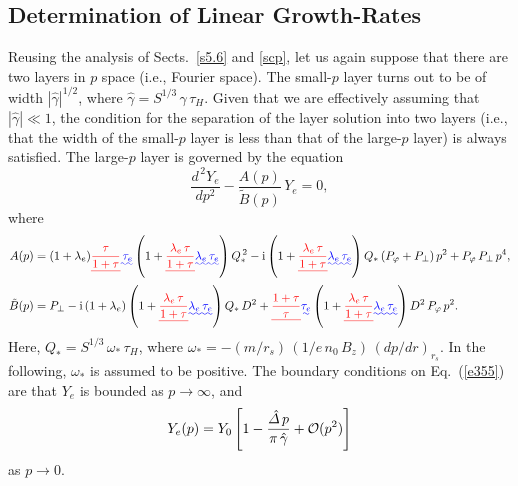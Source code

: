 \documentclass[12pt,prb,aps]{revtex4-1}
\providecommand{\DIFadd}[1]{{\protect\color{blue}\uwave{#1}}} %
\providecommand{\DIFdel}[1]{{\protect\color{red}\sout{#1}}}                      %
\providecommand{\DIFaddbegin}{} %
\providecommand{\DIFaddend}{} %
\providecommand{\DIFdelbegin}{} %
\providecommand{\DIFdelend}{} %
\begin{document}
\subsection{Determination of Linear Growth-Rates}\label{s6.3}
Reusing the analysis of Sects.~\ref{s5.6} and \ref{scp}, let us again suppose that there are two layers in $p$ space (i.e., Fourier space). The
small-$p$ layer turns out to be of width $|\hat{\gamma}|^{1/2}$, where $\hat{\gamma} = S^{1/3}\,\gamma\,\tau_H$. Given that we are effectively assuming that
$|\hat{\gamma}|\ll 1$, the condition for the separation of the layer solution into two layers (i.e., that the width of the small-$p$ layer is less than that of the large-$p$ layer) is always satisfied. The large-$p$ layer is governed by the equation
\begin{equation}\label{e355}
\frac{d^{\,2} Y_e}{dp^2} - \frac{A(p)}{\tilde{B}(p)} \,Y_e =0,
\end{equation}
where 
\begin{align}
A(p) &= (1+\lambda_e)\DIFdelbegin %
\DIFdel{\frac{\tau}{1+\tau}}%
\DIFdelend \DIFaddbegin \DIFadd{\,\tau_e}\DIFaddend \left(1+ \DIFdelbegin \DIFdel{\frac{\lambda_e\,\tau}{1+\tau}}\DIFdelend \DIFaddbegin \DIFadd{\lambda_e\,\tau_e}\DIFaddend \right)Q_\ast^{\,2}
-{\rm i}\left(1+\DIFdelbegin \DIFdel{\frac{\lambda_e\,\tau}{1+\tau}}\DIFdelend \DIFaddbegin \DIFadd{\lambda_e\,\tau_e}\DIFaddend \right)Q_\ast\,(P_\varphi+P_\perp)\,p^2\DIFdelbegin %
\DIFdelend + P_\varphi\,P_\perp\,p^4,\\[0.5ex]
\tilde{B}(p)&= P_\perp - {\rm i}\,(1+\lambda_e)\left(1+\DIFdelbegin \DIFdel{\frac{\lambda_e\,\tau}{1+\tau}}\DIFdelend \DIFaddbegin \DIFadd{\lambda_e\,\tau_e}\DIFaddend \right)Q_\ast\,D^2 +\DIFdelbegin %
\DIFdel{\frac{1+\tau}{\tau}}%
\DIFdelend \DIFaddbegin \DIFadd{\tau_e}\DIFaddend \left(1+\DIFdelbegin \DIFdel{\frac{\lambda_e\,\tau}{1+\tau}}\DIFdelend \DIFaddbegin \DIFadd{\lambda_e\,\tau_e}\DIFaddend \right) D^2\,P_\varphi\,p^2.
\end{align}
Here, $Q_\ast = S^{1/3}\,\omega_\ast\,\tau_H$, where
$\omega_\ast =-(m/r_s)\,(1/e\,n_0\,B_z)\,(dp/dr)_{r_s}$.
In the following, $\omega_\ast$ is assumed to be positive. The boundary conditions on Eq.~(\ref{e355}) are
that $Y_e$ is bounded as $p\rightarrow\infty$, and
\begin{equation}\label{e359}
Y_e(p)= Y_0\left[1-\frac{\hat{\mit\Delta}\,p}{\pi\,\hat{\gamma}} + {\cal O}(p^2)\right]
\end{equation}
as $p\rightarrow 0$. 
\end{document}
